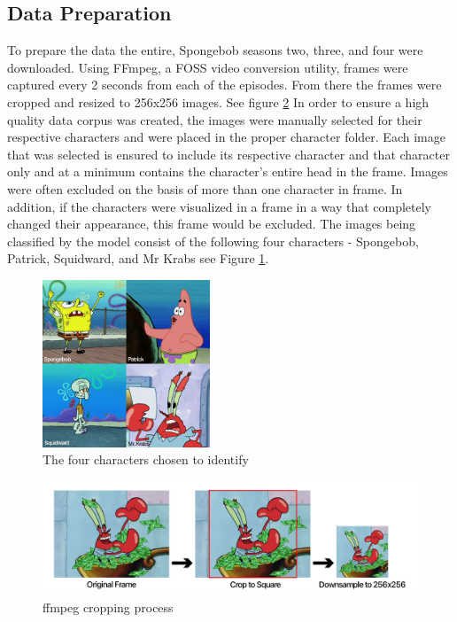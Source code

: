 \documentclass{article}
\begin{document}
\begin{multicols}{2}
\subsection{Data Preparation}
{\quad
To prepare the data the entire, Spongebob seasons two, three, and four were downloaded.
Using FFmpeg, a FOSS video conversion utility, frames were captured every 2 seconds from each of the episodes.
From there the frames were cropped and resized to 256x256 images. See figure \ref{fig:crop}
In order to ensure a high quality data corpus was created, the images were manually selected for their respective characters and were placed in the proper character folder.
Each image that was selected is ensured to include its respective character and that character only and at a minimum contains the character's entire head in the frame.
Images were often excluded on the basis of more than one character in frame.
In addition, if the characters were visualized in a frame in a way that completely changed their appearance, this frame would be excluded.
The images being classified by the model consist of the following four characters - Spongebob, Patrick, Squidward, and Mr Krabs see Figure \ref{fig:collage}.
\vskip 0.1in
\begin{figure}[H]
  \begin{center}
    \includegraphics[width=5cm]{collage.png}
  \end{center}
  \caption{The four characters chosen to identify}
  \label{fig:collage}
\end{figure}

\begin{figure}[H]

  \includegraphics[width=\linewidth]{crop.png}
  \caption{ffmpeg cropping process}
  \label{fig:crop}
\end{figure}


}
\end{multicols}
\end{document}
